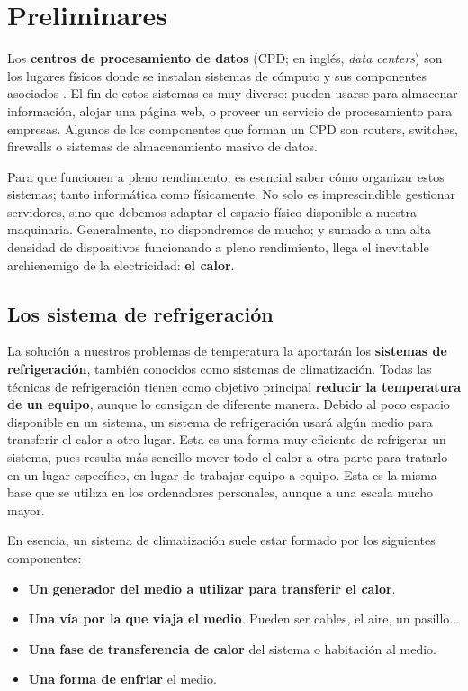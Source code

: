 \chapter{Preliminares}

Los \textbf{centros de procesamiento de datos} (CPD; en inglés, \textit{data centers}) son los lugares físicos donde se instalan sistemas de cómputo y sus componentes asociados \cite{wikipedia-datacenter}. El fin de estos sistemas es muy diverso: pueden usarse para almacenar información, alojar una página web, o proveer un servicio de procesamiento para empresas. Algunos de los componentes que forman un CPD son routers, switches, firewalls o sistemas de almacenamiento masivo de datos.

Para que funcionen a pleno rendimiento, es esencial saber cómo organizar estos sistemas; tanto informática como físicamente. No solo es imprescindible gestionar servidores, sino que debemos adaptar el espacio físico disponible a nuestra maquinaria. Generalmente, no dispondremos de mucho; y sumado a una alta densidad de dispositivos funcionando a pleno rendimiento, llega el inevitable archienemigo de la electricidad: \textbf{el calor}.

\section{Los sistema de refrigeración}

La solución a nuestros problemas de temperatura la aportarán los \textbf{sistemas de refrigeración}, también conocidos como sistemas de climatización. Todas las técnicas de refrigeración tienen como objetivo principal \textbf{reducir la temperatura de un equipo}, aunque lo consigan de diferente manera. Debido al poco espacio disponible en un sistema, un sistema de refrigeración usará algún medio para transferir el calor a otro lugar. Esta es una forma muy eficiente de refrigerar un sistema, pues resulta más sencillo mover todo el calor a otra parte para tratarlo en un lugar específico, en lugar de trabajar equipo a equipo. Esta es la misma base que se utiliza en los ordenadores personales, aunque a una escala mucho mayor.

En esencia, un sistema de climatización suele estar formado por los siguientes componentes:

\begin{itemize}
    \item \textbf{Un generador del medio a utilizar para transferir el calor}.
    \item \textbf{Una vía por la que viaja el medio}. Pueden ser cables, el aire, un pasillo...
    \item \textbf{Una fase de transferencia de calor} del sistema o habitación al medio.
    \item \textbf{Una forma de enfriar} el medio.
\end{itemize}

